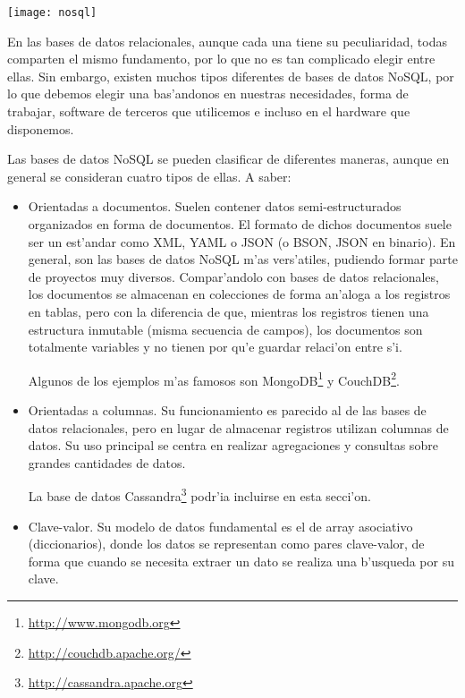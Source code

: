 \begin{center}
\texttt{[image: nosql]}
\end{center}

En las bases de datos relacionales, aunque cada una tiene su peculiaridad, todas comparten
el mismo fundamento, por lo que no es tan complicado elegir entre ellas. Sin embargo, existen
muchos tipos diferentes de bases de datos NoSQL, por lo que debemos elegir una
bas'andonos en nuestras necesidades, forma de trabajar, software de terceros que utilicemos e
incluso en el hardware que disponemos.

Las bases de datos NoSQL se pueden clasificar de diferentes maneras, aunque en general se consideran
cuatro tipos de ellas. A saber:

\begin{itemize}
 \item Orientadas a documentos.
 Suelen contener datos semi-estructurados organizados en forma de documentos. El formato de dichos
 documentos suele ser un est'andar como XML, YAML o JSON (o BSON, JSON en binario). En general, son las bases
 de datos NoSQL m'as vers'atiles, pudiendo formar parte de proyectos muy diversos. Compar'andolo
 con bases de datos relacionales, los documentos se almacenan en colecciones de forma an'aloga
 a los registros en tablas, pero con la diferencia de que, mientras los registros tienen una
 estructura inmutable (misma secuencia de campos), los documentos son totalmente variables y
 no tienen por qu'e guardar relaci'on entre s'i.
 
 Algunos de los ejemplos m'as famosos son MongoDB\footnote{\url{http://www.mongodb.org}} y CouchDB\footnote{\url{http://couchdb.apache.org/}}.
 
 \item Orientadas a columnas.
 Su funcionamiento es parecido al de las bases de datos relacionales, pero en lugar de almacenar registros
 utilizan columnas de datos. Su uso principal se centra en realizar agregaciones y consultas sobre
 grandes cantidades de datos.
 
 La base de datos Cassandra\footnote{\url{http://cassandra.apache.org}} podr'ia incluirse en esta secci'on.
 
 \item Clave-valor.
 Su modelo de datos fundamental es el de array asociativo (diccionarios), donde los datos se representan
 como pares clave-valor, de forma que cuando se necesita extraer un dato se realiza una
 b'usqueda por su clave.
 

\end{itemize}
